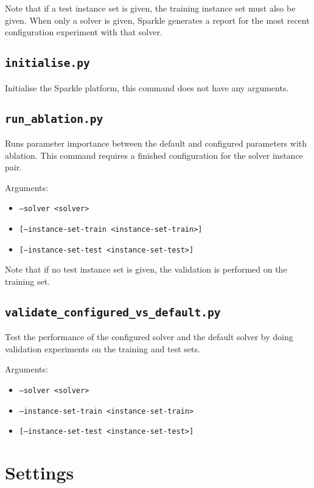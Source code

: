 \documentclass{article}
\begin{document}
Note that if a test instance set is given, the training instance set must also be given. When only a solver is given, Sparkle generates a report for the most recent configuration experiment with that solver.

\subsection{\texttt{initialise.py}}
\label{cmd:initialise}

Initialise the Sparkle platform, this command does not have any arguments.

\subsection{\texttt{run\_ablation.py}}
\label{cmd:run_ablation}
Runs parameter importance between the default and configured parameters with ablation. This command requires a finished configuration for the solver instance pair.

Arguments:
\begin{itemize}[noitemsep]
  \item[] \texttt{--solver <solver>}
  \item[] \texttt{[--instance-set-train <instance-set-train>]}
  \item[] \texttt{[--instance-set-test <instance-set-test>]}
\end{itemize}

Note that if no test instance set is given, the validation is performed on the training set.


\subsection{\texttt{validate\_configured\_vs\_default.py}}
\label{cmd:validate_configured_vs_default}
Test the performance of the configured solver and the default solver by doing validation experiments on the training and test sets.

Arguments:
\begin{itemize}[noitemsep]
  \item[] \texttt{--solver <solver>}
  \item[] \texttt{--instance-set-train <instance-set-train>}
  \item[] \texttt{[--instance-set-test <instance-set-test>]}
\end{itemize}

\section{Settings}
\end{document}
